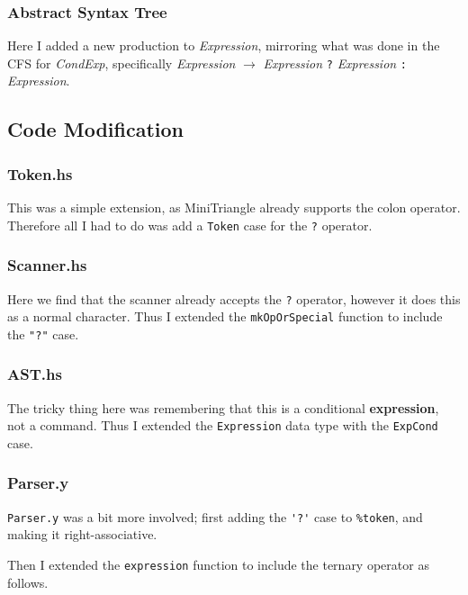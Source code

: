 \documentclass[12pt]{article}
\newcommand{\lstin}[3]{
  
}
\begin{document}
\subsubsection{Abstract Syntax Tree}
Here I added a new production to \textit{Expression}, mirroring what was done in the CFS for \textit{CondExp}, specifically \textit{Expression} $\rightarrow$ \textit{Expression} \verb|?| \textit{Expression} \verb|:| \textit{Expression}.

\subsection{Code Modification}
\subsubsection{Token.hs}
This was a simple extension, as MiniTriangle already supports the colon operator. 
Therefore all I had to do was add a \verb|Token| case for the \verb|?| operator.

\lstin{33}{33}{Token.hs}

\subsubsection{Scanner.hs}
Here we find that the scanner already accepts the \verb|?| operator, however it does this as a normal character. 
Thus I extended the \verb|mkOpOrSpecial| function to include the \verb|"?"| case.

\lstin{134}{134}{Scanner.hs}

\subsubsection{AST.hs}
The tricky thing here was remembering that this is a conditional \textbf{expression}, not a command. 
Thus I extended the \verb|Expression| data type with the \verb|ExpCond| case.

\lstin{162}{167}{AST.hs}

\subsubsection{Parser.y}
\verb|Parser.y| was a bit more involved; first adding the \verb|'?'| case to \verb|%token|, and making it right-associative.

\lstin{74}{74}{Parser.y}
\lstin{99}{99}{Parser.y}

Then I extended the \verb|expression| function to include the ternary operator as follows.
\end{document}
